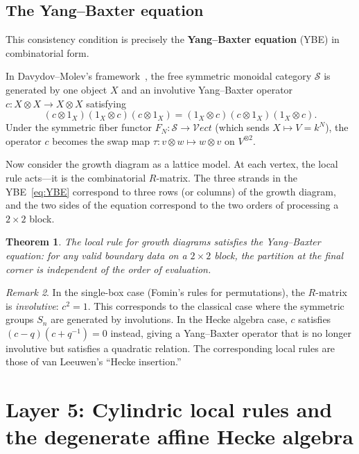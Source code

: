 \documentclass[12pt,a4paper]{article}
\newtheorem{theorem}{Theorem}[section]
\theoremstyle{definition}
\theoremstyle{remark}
\newtheorem{remark}[theorem]{Remark}
\newcommand{\Vect}{\mathcal{V}\!ect}
\begin{document}
\subsection{The Yang--Baxter equation}

This consistency condition is precisely the \textbf{Yang--Baxter
equation} (YBE) in combinatorial form.

In Davydov--Molev's framework~\cite{DM}, the free symmetric monoidal
category $\mathcal{S}$ is generated by one object $X$ and an
involutive Yang--Baxter operator $c : X \otimes X \to X \otimes X$
satisfying
\begin{equation}\label{eq:YBE}
  (c \otimes 1_X)(1_X \otimes c)(c \otimes 1_X)
  = (1_X \otimes c)(c \otimes 1_X)(1_X \otimes c).
\end{equation}
Under the symmetric fiber functor $F_N : \mathcal{S} \to \Vect$ (which
sends $X \mapsto V = k^N$), the operator $c$ becomes the swap map
$\tau : v \otimes w \mapsto w \otimes v$ on $V^{\otimes 2}$.

Now consider the growth diagram as a lattice model. At each vertex,
the local rule acts---it is the combinatorial $R$-matrix. The three
strands in the YBE~\eqref{eq:YBE} correspond to three rows (or
columns) of the growth diagram, and the two sides of the equation
correspond to the two orders of processing a $2 \times 2$ block.

\begin{theorem}\label{thm:local-rule-YBE}
The local rule for growth diagrams satisfies the Yang--Baxter
equation: for any valid boundary data on a $2 \times 2$ block, the
partition at the final corner is independent of the order of
evaluation.
\end{theorem}

\begin{remark}
In the single-box case (Fomin's rules for permutations), the
$R$-matrix is \emph{involutive}: $c^2 = 1$. This corresponds to the
classical case where the symmetric groups $S_n$ are generated by
involutions. In the Hecke algebra case, $c$ satisfies $(c-q)(c+q^{-1})
= 0$ instead, giving a Yang--Baxter operator that is no longer
involutive but satisfies a quadratic relation. The corresponding local
rules are those of van Leeuwen's ``Hecke insertion.''
\end{remark}

\section{Layer 5: Cylindric local rules and the degenerate affine
  Hecke algebra}
\label{sec:cylindric}
\end{document}
